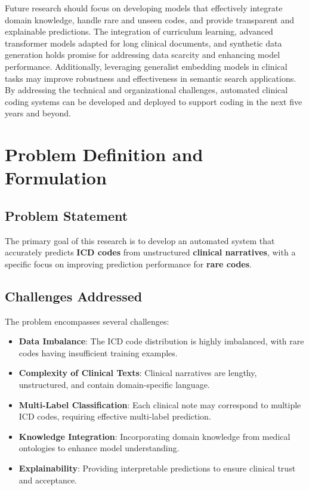 \documentclass[12pt,a4paper]{report}
\begin{document}
Future research should focus on developing models that effectively integrate domain knowledge, handle rare and unseen codes, and provide transparent and explainable predictions. The integration of curriculum learning, advanced transformer models adapted for long clinical documents, and synthetic data generation holds promise for addressing data scarcity and enhancing model performance. Additionally, leveraging generalist embedding models in clinical tasks may improve robustness and effectiveness in semantic search applications. By addressing the technical and organizational challenges, automated clinical coding systems can be developed and deployed to support coding in the next five years and beyond.

\chapter{Problem Definition and Formulation}

\section{Problem Statement}
The primary goal of this research is to develop an automated system that accurately predicts \textbf{ICD codes} from unstructured \textbf{clinical narratives}, with a specific focus on improving prediction performance for \textbf{rare codes}.

\section{Challenges Addressed}
The problem encompasses several challenges:
\begin{itemize}
    \item \textbf{Data Imbalance}: The ICD code distribution is highly imbalanced, with rare codes having insufficient training examples.
    \item \textbf{Complexity of Clinical Texts}: Clinical narratives are lengthy, unstructured, and contain domain-specific language.
    \item \textbf{Multi-Label Classification}: Each clinical note may correspond to multiple ICD codes, requiring effective multi-label prediction.
    \item \textbf{Knowledge Integration}: Incorporating domain knowledge from medical ontologies to enhance model understanding.
    \item \textbf{Explainability}: Providing interpretable predictions to ensure clinical trust and acceptance.
\end{itemize}
\end{document}
